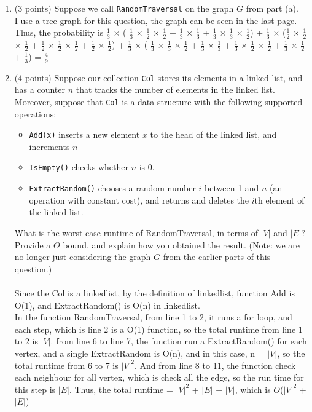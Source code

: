 \documentclass{assignment-263}
\begin{document}
\begin{enumerate}
\begin{enumerate}
\item (3 points)
Suppose we call \verb|RandomTraversal| on the graph $G$ from part (a).\\
I use a tree graph for this question, the graph can be seen in the last page.\\
Thus, the probability is $\frac{1}{3}$ $\times$ ( $\frac{1}{3}$ $\times$ $\frac{1}{2}$ $\times$ $\frac{1}{2}$ + $\frac{1}{3}$ $\times$ $\frac{1}{3}$ + $\frac{1}{3}$ $\times$ $\frac{1}{3}$ $\times$ $\frac{1}{2}$) + $\frac{1}{3}$ $\times$ ($\frac{1}{2}$ $\times$ $\frac{1}{2}$ $\times$ $\frac{1}{2}$ + $\frac{1}{2}$ $\times$ $\frac{1}{2}$ $\times$ $\frac{1}{2}$ + $\frac{1}{2}$ $\times$ $\frac{1}{2}$) +  $\frac{1}{3}$ $\times$  ( $\frac{1}{3}$ $\times$  $\frac{1}{3}$ $\times$ $\frac{1}{2}$ + $\frac{1}{3}$ $\times$  $\frac{1}{3}$ + $\frac{1}{3}$ $\times$ $\frac{1}{2}$ $\times$ $\frac{1}{2}$ + $\frac{1}{3}$ $\times$ $\frac{1}{2}$ + $\frac{1}{3}$) = $\frac{4}{9}$

\item (4 points)
Suppose our collection \verb|Col| stores its elements in a linked list,
and has a counter $n$ that tracks the number of elements in the linked list. Moreover,
suppose that \verb|Col| is a data structure with the following supported operations:

\begin{itemize}
    \item \verb|Add(x)| inserts a new element $x$ to the head of the linked list, and increments $n$
    \item \verb|IsEmpty()| checks whether $n$ is 0.
    \item \verb|ExtractRandom()| chooses a random number $i$ between 1 and $n$ (an operation with constant cost), and returns and deletes the $i$th element of the linked list.
\end{itemize}

What is the worst-case runtime of RandomTraversal, in terms of $|V|$ and $|E|$?
Provide a $\Theta$ bound, and explain how you obtained the result.
(Note: we are no longer just considering the graph $G$ from the earlier parts of this question.)\\\\
Since the Col is a linkedlist, by the definition of linkedlist, function Add is O(1), and ExtractRandom() is O(n) in linkedlist.\\
In the function RandomTraversal, from line 1 to 2, it runs a for loop, and each step, which is line 2 is a  O(1) function, so the total runtime from line 1 to 2 is $|V|$. from line 6 to line 7, the function run a ExtractRandom() for each vertex, and a single ExtractRandom is O(n), and in this case, n = $|V|$, so the total runtime from 6 to 7 is $|V|^2$. And from line 8 to 11, the function check each neighbour for all vertex, which is check all the edge, so the run time for this step is $|E|$.
Thus, the total runtime = $|V|^2$ + $|E|$ + $|V|$, which is $O$($|V|^2$ + $|E|$)


\end{enumerate}
\end{enumerate}
\end{document}
